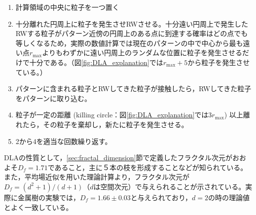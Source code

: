 \documentclass[autodetect-engine,dvi=dvipdfmx,a4paper,ja=standard,oneside,openany,11pt]{bxjsbook}
\begin{document}
\begin{enumerate}
  \item 計算領域の中央に粒子を一つ置く
  \item 十分離れた円周上に粒子を発生させRWさせる。十分遠い円周上で発生したRWする粒子がパターン近傍の円周上のある点に到達する確率はどの点でも等しくなるため，実際の数値計算では現在のパターンの中で中心から最も遠い点$r_\mathrm{max}$よりもわずかに遠い円周上のランダムな位置に粒子を発生させるだけで十分である。（図\ref{fig:DLA_explanation}では$r_{\mathrm{max}}+5$から粒子を発生させている。）
  \item パターンに含まれる粒子とRWしてきた粒子が接触したら，RWしてきた粒子をパターンに取り込む。
  \item 粒子が一定の距離 (killing circle：図\ref{fig:DLA_explanation}では$3r_{\mathrm{max}}$) 以上離れたら，その粒子を棄却し，新たに粒子を発生させる。
  \item 2から4を適当な回数繰り返す。
\end{enumerate}

DLAの性質として，\ref{sec:fractal_dimension}節で定義したフラクタル次元がおおよそ$D_f=1.71$であること\cite{太田正之輔2009dla}，主に５本の枝を形成することなどが知られている\cite{ohta2004mode}。また，平均場近似を用いた理論計算より，フラクタル次元が$D_f=(d^2+1)/(d+1)$（$d$は空間次元）で与えられる\cite{muthukumar1983mean}\cite{tokuyama1984fractal}ことが示されている。実際に金属樹の実験\cite{matsushita1984fractal}では，$D_f=1.66\pm0.03$と与えられており，$d=2$の時の理論値とよく一致している。

\ifdraft{
  
  
}{}
\end{document}
